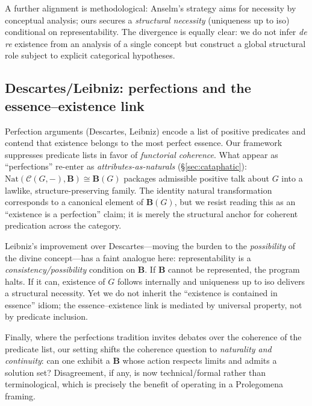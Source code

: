 \documentclass[11pt]{article}
\theoremstyle{upright}
\begin{document}
A further alignment is methodological: Anselm’s strategy aims for necessity by conceptual analysis; ours secures a \emph{structural necessity} (uniqueness up to iso) conditional on representability. The divergence is equally clear: we do not infer \emph{de re} existence from an analysis of a single concept but construct a global structural role subject to explicit categorical hypotheses.

\subsection{Descartes/Leibniz: perfections and the essence–existence link}
Perfection arguments (Descartes, Leibniz) encode a list of positive predicates and contend that existence belongs to the most perfect essence. Our framework suppresses predicate lists in favor of \emph{functorial coherence}. What appear as “perfections” re-enter as \emph{attributes-as-naturals} (\S\ref{sec:cataphatic}): \(\mathrm{Nat}(\mathcal C(G,-),\mathbf B)\cong \mathbf B(G)\) packages admissible positive talk about \(G\) into a lawlike, structure-preserving family. The identity natural transformation corresponds to a canonical element of \(\mathbf B(G)\), but we resist reading this as an “existence is a perfection” claim; it is merely the structural anchor for coherent predication across the category.

Leibniz’s improvement over Descartes—moving the burden to the \emph{possibility} of the divine concept—has a faint analogue here: representability is a \emph{consistency/possibility} condition on \(\mathbf B\). If \(\mathbf B\) cannot be represented, the program halts. If it can, existence of \(G\) follows internally and uniqueness up to iso delivers a structural necessity. Yet we do not inherit the “existence is contained in essence” idiom; the essence–existence link is mediated by universal property, not by predicate inclusion.

Finally, where the perfections tradition invites debates over the coherence of the predicate list, our setting shifts the coherence question to \emph{naturality and continuity}: can one exhibit a \(\mathbf B\) whose action respects limits and admits a solution set? Disagreement, if any, is now technical/formal rather than terminological, which is precisely the benefit of operating in a Prolegomena framing.
\end{document}
